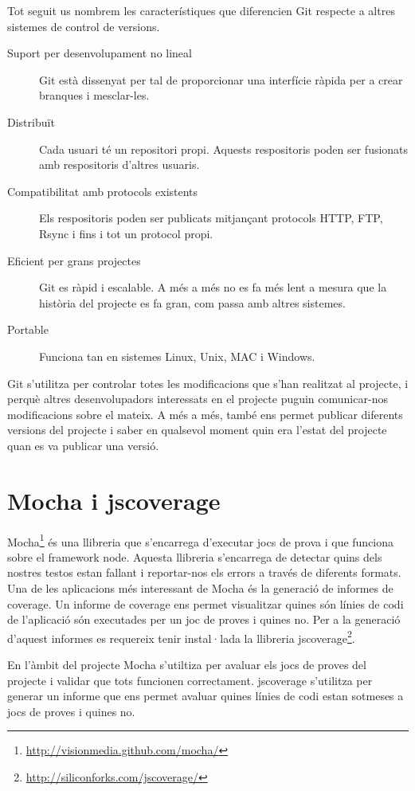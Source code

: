 Tot seguit us nombrem les característiques que diferencien Git respecte a altres sistemes de control de versions.

\begin{description}
    \item[Suport per desenvolupament no lineal] Git està dissenyat per tal de proporcionar una interfície ràpida per a crear branques i mesclar-les.
    \item[Distribuït] Cada usuari té un repositori propi. Aquests respositoris poden ser fusionats amb respositoris d'altres usuaris.
    \item[Compatibilitat amb protocols existents] Els respositoris poden ser publicats mitjançant protocols HTTP, FTP, Rsync i fins i tot un protocol propi.
    \item[Eficient per grans projectes] Git es ràpid i escalable. A més a més no es fa més lent a mesura que la història del projecte es fa gran, com passa amb altres sistemes.
    \item[Portable] Funciona tan en sistemes Linux, Unix, MAC i Windows.
\end{description}

Git s'utilitza per controlar totes les modificacions que s'han realitzat al projecte, i perquè altres desenvolupadors interessats en el projecte puguin comunicar-nos modificacions sobre el mateix. A més a més, també ens permet publicar diferents versions del projecte i saber en qualsevol moment quin era l'estat del projecte quan es va publicar una versió. 


\section{Mocha i jscoverage}
\label{sec:mocha-jscoverage}

Mocha\footnote{\url{http://visionmedia.github.com/mocha/}} és una llibreria que s'encarrega d'executar jocs de prova i que funciona sobre el framework node. Aquesta llibreria s'encarrega de detectar quins dels nostres testos estan fallant i reportar-nos els errors a través de diferents formats. Una de les aplicacions més interessant de Mocha és la generació de informes de coverage. Un informe de coverage ens permet visualitzar quines són línies de codi de l'aplicació són executades per un joc de proves i quines no. Per a la generació d'aquest informes es requereix tenir instal·lada la llibreria jscoverage\footnote{\url{http://siliconforks.com/jscoverage/}}. 

En l'àmbit del projecte Mocha s'utiltiza per avaluar els jocs de proves del projecte i validar que tots funcionen correctament. jscoverage s'utilitza per generar un informe que ens permet avaluar quines línies de codi estan sotmeses a jocs de proves i quines no.

